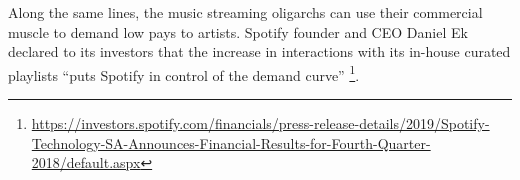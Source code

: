 Along the same lines, the music streaming oligarchs can use their commercial muscle to demand low pays to artists. Spotify founder and CEO Daniel Ek declared to its investors that the increase in interactions with its in-house curated playlists ``puts Spotify in control of the demand curve'' \footnote{\url{https://investors.spotify.com/financials/press-release-details/2019/Spotify-Technology-SA-Announces-Financial-Results-for-Fourth-Quarter-2018/default.aspx}}.
